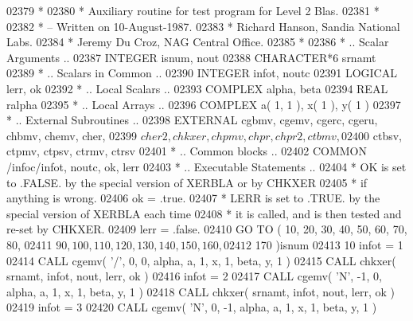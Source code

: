 \begin{DoxyCode}
02379 \textcolor{comment}{*}
02380 \textcolor{comment}{*  Auxiliary routine for test program for Level 2 Blas.}
02381 \textcolor{comment}{*}
02382 \textcolor{comment}{*  -- Written on 10-August-1987.}
02383 \textcolor{comment}{*     Richard Hanson, Sandia National Labs.}
02384 \textcolor{comment}{*     Jeremy Du Croz, NAG Central Office.}
02385 \textcolor{comment}{*}
02386 \textcolor{comment}{*     .. Scalar Arguments ..}
02387       \textcolor{keywordtype}{INTEGER}            isnum, nout
02388       \textcolor{keywordtype}{CHARACTER*6}        srnamt
02389 \textcolor{comment}{*     .. Scalars in Common ..}
02390       \textcolor{keywordtype}{INTEGER}            infot, noutc
02391       \textcolor{keywordtype}{LOGICAL}            lerr, ok
02392 \textcolor{comment}{*     .. Local Scalars ..}
02393       \textcolor{keywordtype}{COMPLEX}            alpha, beta
02394       \textcolor{keywordtype}{REAL}               ralpha
02395 \textcolor{comment}{*     .. Local Arrays ..}
02396       \textcolor{keywordtype}{COMPLEX}            a( 1, 1 ), x( 1 ), y( 1 )
02397 \textcolor{comment}{*     .. External Subroutines ..}
02398       \textcolor{keywordtype}{EXTERNAL}           cgbmv, cgemv, cgerc, cgeru, chbmv, chemv, cher,
02399      $                   cher2, chkxer, chpmv, chpr, chpr2, ctbmv,
02400      $                   ctbsv, ctpmv, ctpsv, ctrmv, ctrsv
02401 \textcolor{comment}{*     .. Common blocks ..}
02402       \textcolor{keyword}{COMMON}             /infoc/infot, noutc, ok, lerr
02403 \textcolor{comment}{*     .. Executable Statements ..}
02404 \textcolor{comment}{*     OK is set to .FALSE. by the special version of XERBLA or by CHKXER}
02405 \textcolor{comment}{*     if anything is wrong.}
02406       ok = .true.
02407 \textcolor{comment}{*     LERR is set to .TRUE. by the special version of XERBLA each time}
02408 \textcolor{comment}{*     it is called, and is then tested and re-set by CHKXER.}
02409       lerr = .false.
02410       \textcolor{keywordflow}{GO TO} ( 10, 20, 30, 40, 50, 60, 70, 80,
02411      $        90, 100, 110, 120, 130, 140, 150, 160,
02412      $        170 )isnum
02413    10 infot = 1
02414       \textcolor{keyword}{CALL }cgemv( \textcolor{stringliteral}{'/'}, 0, 0, alpha, a, 1, x, 1, beta, y, 1 )
02415       \textcolor{keyword}{CALL }chkxer( srnamt, infot, nout, lerr, ok )
02416       infot = 2
02417       \textcolor{keyword}{CALL }cgemv( \textcolor{stringliteral}{'N'}, -1, 0, alpha, a, 1, x, 1, beta, y, 1 )
02418       \textcolor{keyword}{CALL }chkxer( srnamt, infot, nout, lerr, ok )
02419       infot = 3
02420       \textcolor{keyword}{CALL }cgemv( \textcolor{stringliteral}{'N'}, 0, -1, alpha, a, 1, x, 1, beta, y, 1 )

\end{DoxyCode}
